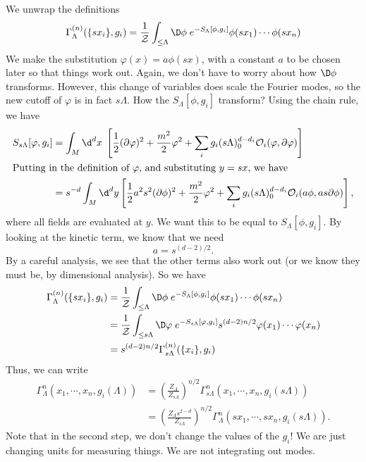 \documentclass[a4paper]{article}
\begin{document}
We unwrap the definitions
\[
  \Gamma_\Lambda^{(n)} (\{s x_i\}, g_i) = \frac{1}{\mathcal{Z}}\int_{\leq \Lambda} \D \phi\; e^{-S_\Lambda[\phi, g_i]} \phi(s x_1) \cdots \phi(s x_n)
\]
We make the substitution $\varphi(x) = a \phi(sx)$, with a constant $a$ to be chosen later so that things work out. Again, we don't have to worry about how $\D \phi$ transforms. However, this change of variables does scale the Fourier modes, so the new cutoff of $\varphi$ is in fact $s\Lambda$. How the $S_\Lambda[\phi, g_i]$ transform? Using the chain rule, we have
\begin{align*}
  S_{s\Lambda}[\varphi, g_i] &= \int_M \d^d x\; \left[\frac{1}{2}(\partial \varphi)^2 + \frac{m^2}{2} \varphi^2 + \sum_i g_i (s\Lambda)^{d - d_i}_0 \mathcal{O}_i(\varphi , \partial\varphi)\right]\\
  \intertext{Putting in the definition of $\varphi$, and substituting $y = sx$, we have}
  &= s^{-d} \int_M \d^d y\left[\frac{1}{2}a^2 s^2 (\partial \phi)^2 + \frac{m^2}{2} \varphi^2 + \sum_i g_i (s\Lambda)^{d - d_i}_0 \mathcal{O}_i(a \phi, as \partial\phi)\right],
\end{align*}
where all fields are evaluated at $y$. We want this to be equal to $S_\Lambda[\phi, g_i]$. By looking at the kinetic term, we know that we need
\[
  a = s^{(d - 2)/2}.
\]
By a careful analysis, we see that the other terms also work out (or we know they must be, by dimensional analysis). So we have
\begin{align*}
  \Gamma_\Lambda^{(n)} (\{s x_i\}, g_i) &= \frac{1}{\mathcal{Z}}\int_{\leq \Lambda} \D \phi\; e^{-S_\Lambda[\phi, g_i]} \phi(s x_1) \cdots \phi(s x_n)\\
   &= \frac{1}{\mathcal{Z}}\int_{\leq s\Lambda} \D \varphi\; e^{-S_{s\Lambda}[\varphi, g_i]} s^{(d - 2)n/2} \varphi(x_1) \cdots \varphi(x_n)\\
   &= s^{(d - 2) n/2}\Gamma_{s\Lambda}^{(n)} (\{x_i\}, g_i)
\end{align*}
%
Thus, we can write
\begin{align*}
  \Gamma_\Lambda^n (x_1, \cdots, x_n, g_i(\Lambda)) &= \left(\frac{Z_\Lambda}{Z_{s\Lambda}}\right)^{n/2} \Gamma^n_{s\Lambda} (x_1, \cdots, x_n, g_i (s\Lambda))\\
  &= \left(\frac{Z_\Lambda s^{2 - d}}{Z_{s\Lambda}}\right)^{n/2} \Gamma_\Lambda^n (s x_1, \cdots, s x_n, g_i(s\Lambda)).
\end{align*}
Note that in the second step, we don't change the values of the $g_i$! We are just changing units for measuring things. We are not integrating out modes.
\end{document}

